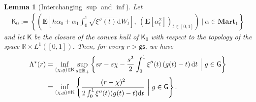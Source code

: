 \documentclass[11pt]{amsart}
\newtheorem{lemma}[proposition]{Lemma}
\theoremstyle{remark}
\theoremstyle{definition}
\numberwithin{equation}{section}
\numberwithin{proposition}{section}
\numberwithin{figure}{section}
\numberwithin{table}{section}
\newcommand{\R}{\mathbb{R}}
\newcommand{\EE}{\mathbf{E}}
\newcommand{\Ll}{\left}
\newcommand{\Rr}{\right}
\renewcommand{\d}{\mathrm{d}}
\newcommand{\1}{\mathbf{1}}
\newcommand{\msf}{\mathsf}
\newcommand{\al}{\alpha}
\newcommand{\bmart}{\mathbf{Mart}}
\newcommand{\gs}{\msf {gs}}
\begin{document}
\begin{lemma}[Interchanging $\sup$ and $\inf$]\label{l.Lambda^*_inter_inf_sup}
Let
\begin{align*}
    \msf K_0 := \Ll\{\Ll(\EE\Ll[h \al_0+\alpha_1\int_0^1\sqrt{\xi''(t)}\d W_t\Rr],\ \Ll(\EE[\alpha^2_t]\Rr)_{t\in[0,1]}\Rr)\ \bigg|\ \alpha\in\bmart_1\Rr\}
\end{align*}
and let $\msf K$ be the closure of the convex hull of $\msf K_0$ with respect to the topology of the space $\R\times L^1([0,1])$. Then, for every $r>\gs$, we have
\begin{align}
    \Lambda^*(r) &= \inf_{(\chi,g)\in\msf K}\sup_{s\in\R_+}\Ll\{sr-s\chi-\frac{s^2}{2}\int_0^1 \xi''(t)\Ll(g(t) -t \Rr)\d t\ \Big|\ g\in\msf G\Rr\}\notag
    \\
    &=\inf_{(\chi,g)\in\msf K}\Ll\{ \frac{(r-\chi)^2}{2\int_0^1\xi''(t)(g(t)-t)\d t}  \ \bigg|\ g\in \msf G\Rr\}. \label{e.Lambda^*_inter_inf_sup}
\end{align}
\end{lemma}
\end{document}
